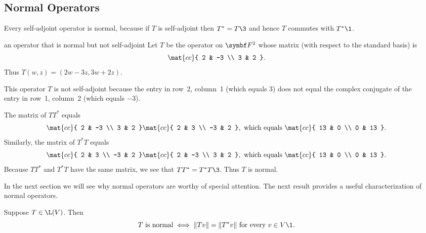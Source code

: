 \subsection{Normal Operators}


Every self-adjoint operator is normal, because if $T$ is self-adjoint then $T^* = T\3$ and hence $T$ commutes with $T^*\1$.

\begin{example}[normalnotsa]{an operator that is normal but not self-adjoint}
{Let $T$ be the operator on $\F{2}$ whose matrix (with respect to the standard basis) is
\[ \addtolength{\abovedisplayshortskip}{-1.5bp}
\mat{cc}{
2 & -3 \\
3 & 2 }.
\]
Thus $T(w, z) = (2w-3z, 3w + 2z)$.
}

\pagebreak[3]

This operator $T$ is not self-adjoint because the entry in row~2, column~1 (which equals $3$) does not equal the complex conjugate of the entry in row~1, column~2 (which equals $-3$).

The matrix of $TT^*$ equals
\[
\mat{cc}{
2 & -3 \\
3 & 2 } \mat{cc}{
2 & 3 \\
-3 & 2 },
\text{\ which equals\ }
\mat{cc}{
13 & 0 \\
0 & 13 }.
\]
Similarly, the matrix of $T^*T$ equals
\[
\mat{cc}{
2 & 3 \\
-3 & 2 }
\mat{cc}{
2 & -3 \\
3 & 2 },
\text{\ which equals\ }
\mat{cc}{
13 & 0 \\
0 & 13 }.
\]
Because $TT^*$ and $T^*T$ have the same matrix, we see that $TT^* = T^*T\3$. Thus $T$ is normal.
\end{example}

In the next section we will see why normal operators are worthy of special attention. The next result provides a useful characterization of normal operators.

{Suppose $T \in \L(V)$. Then
\[
T \text{ is normal} \iff \|Tv\| = \|T^*v\| \text{ for every } v \in V\1.
\]}

